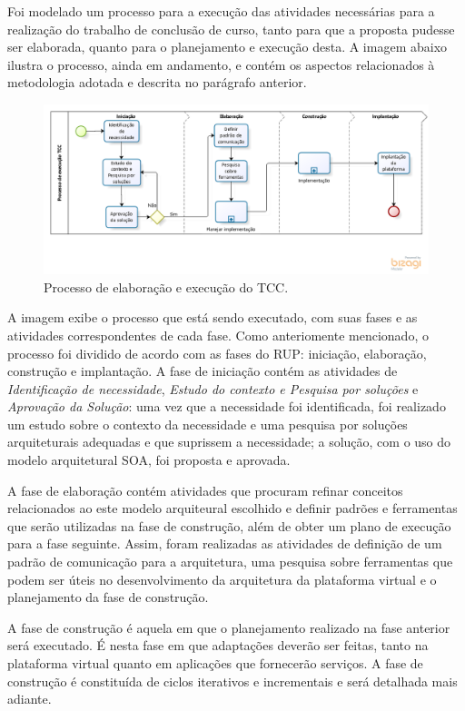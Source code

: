 Foi modelado um processo para a execução das atividades necessárias para a realização do trabalho de conclusão de curso, tanto para que a proposta pudesse ser elaborada, quanto para o planejamento e execução desta. A imagem abaixo ilustra o processo, ainda em andamento, e contém os aspectos relacionados à metodologia adotada e descrita no parágrafo anterior.

\begin{figure}[htb]
\centering
\includegraphics[width=1\textwidth]{figuras/processo_tcc.PNG}
\caption{Processo de elaboração e execução do TCC.}
\label{processo_tcc}
\end{figure}

A imagem exibe o processo que está sendo executado, com suas fases e as atividades correspondentes de  cada fase. Como anteriomente mencionado, o processo foi dividido de acordo com as fases do RUP: iniciação, elaboração, construção e implantação. A fase de iniciação contém as atividades de \textit{Identificação de necessidade}, \textit{Estudo do contexto e Pesquisa por soluções} e \textit{Aprovação da Solução}: uma vez que a necessidade foi identificada, foi realizado um estudo sobre o contexto da necessidade e uma pesquisa por soluções arquiteturais adequadas e que suprissem a necessidade; a solução, com o uso do modelo arquitetural SOA, foi proposta e aprovada.

A fase de elaboração contém atividades que procuram refinar conceitos relacionados ao este modelo arquiteural escolhido e definir padrões e ferramentas que serão utilizadas na fase de construção, além de obter um plano de execução para a fase seguinte. Assim, foram realizadas as atividades de definição de um padrão de comunicação para a arquitetura, uma pesquisa sobre ferramentas que podem ser úteis no desenvolvimento da arquitetura da plataforma virtual e o planejamento da fase de construção.

A fase de construção é aquela em que o planejamento realizado na fase anterior será executado. É nesta fase em que adaptações deverão ser feitas, tanto na plataforma virtual quanto em aplicações que fornecerão serviços. A fase de construção é constituída de ciclos iterativos e incrementais e será detalhada mais adiante.

